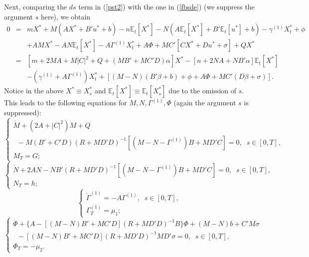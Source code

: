 \documentclass[final]{siamltex}
\begin{document}
Next, comparing the $ds$ term in (\ref{pst2}) with the one in (\ref{fbsde}) (we suppress the argument $s$ here), we obtain
\begin{eqnarray*}
0&=&m X^* +M(AX^*+B'u^*+b)-n \mathbb E_t[X^*]-N(A\mathbb E_t[X^*]+B'\mathbb E_t[u^*]+b)-\gamma^{(1)} X^*_t+\phi\\
&&+AMX^*-AN\mathbb E_t[X^*]- A\Gamma^{(1)} X_t^*+A\Phi+MC'[CX^*+Du^*+\sigma]+QX^*\\
&=&[m+2MA+M|C|^2+Q+(MB'+MC'D)\alpha]X^*-[n+2NA+NB'\alpha]{\mathbb{E}_t\left[{X^*}\right]}\\
&&-(\gamma^{(1)}+A\Gamma^{(1)})X_t^*
+[(M-N)(B'\beta+b)+\phi+A\Phi+MC'(D\beta+\sigma)].
\end{eqnarray*}
Notice in the above $X^*\equiv X^*_s$ and ${\mathbb{E}_t\left[{X^*}\right]}\equiv {\mathbb{E}_t\left[{X^*_s}\right]}$ due to the omission of $s$.
This leads to the following equations for $M,N,\Gamma^{(1)},\Phi$ (again the argument $s$ is suppressed):
\begin{equation}\label{Ric1}
\left\{\begin{array}{l}
\dot{M}+(2A+|C|^2)M+Q\\
\;\;-M(B'+C'D)(R+MD'D)^{-1}[(M-N-\Gamma^{(1)})B+MD'C]=0,\;\;s\in[0,T],\\
M_T=G;
\end{array}\right.
\end{equation}
\begin{equation}\label{Ric2}
\left\{\begin{array}{l}
\dot{N}+2AN-NB'(R+MD'D)^{-1}[(M-N-\Gamma^{(1)})B+MD'C]=0,\;\;s\in[0,T],\\
N_T=h;
\end{array}\right.
\end{equation}
\begin{equation}\label{Ric3}
\left\{\begin{array}{l}
  \dot{\Gamma}^{(1)}=-A\Gamma^{(1)},\;\;s\in[0,T],\\
  \Gamma^{(1)}_T=\mu_1 ;
  \end{array}\right.
\end{equation}
\begin{equation}\label{Ric4}
\left\{\begin{array}{l}
\dot{\Phi}+\{A-[(M-N) B'+MC'D](R+MD'D)^{-1}  B\}\Phi+(M-N)b+C'M\sigma\\
\;\; -[(M-N) B'+MC'D](R+MD'D)^{-1}MD'\sigma =0,\;\;s\in[0,T],\\
\Phi_T=-\mu_2.
\end{array}\right.
\end{equation}
\end{document}
